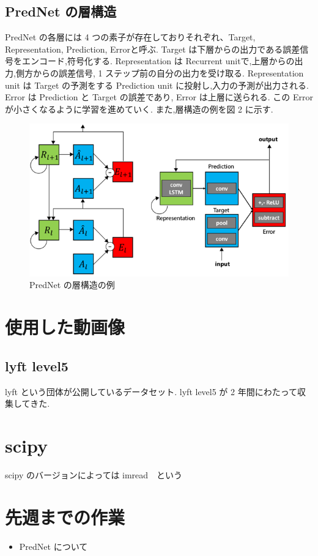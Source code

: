 \subsection{PredNet の層構造}
PredNet の各層には 4 つの素子が存在しておりそれぞれ、Target, Representation, Prediction, Errorと呼ぶ.
Target は下層からの出力である誤差信号をエンコード,符号化する.
Representation は Recurrent unitで,上層からの出力,側方からの誤差信号, 1 ステップ前の自分の出力を受け取る.
Representation unit は Target の予測をする Prediction unit に投射し,入力の予測が出力される.
Error は Prediction と Target の誤差であり, Error は上層に送られる.
この Error が小さくなるように学習を進めていく.
また,層構造の例を図 2 に示す.

 \begin{figure}[hb]
\includegraphics[scale=0.4]{prednet.png}
 \caption{PredNet の層構造の例}
\end{figure}

\section{使用した動画像}
\subsection{lyft level5}
lyft という団体が公開しているデータセット. lyft level5 が 2 年間にわたって収集してきた.

\section{scipy}
scipy のバージョンによっては imread　という
\section{先週までの作業}
\begin{itemize}
          \item PredNet について
          
\end{itemize}

